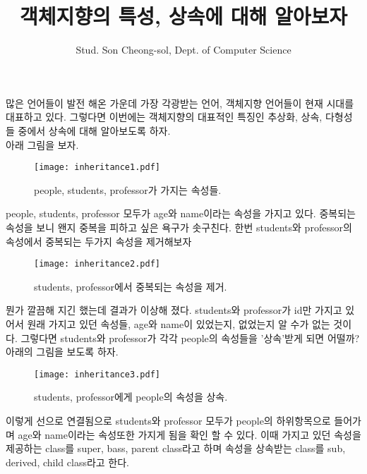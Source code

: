 \documentclass{oblivoir}
\title{객체지향의 특성, 상속에 대해 알아보자 }
\author{Stud. Son Cheong-sol, Dept. of Computer Science}
\begin{document}
\maketitle

많은 언어들이 발전 해온 가운데 가장 각광받는 언어, 객체지향 언어들이 현재 시대를 대표하고 있다. 그렇다면 이번에는 객체지향의 대표적인 특징인 추상화, 상속, 다형성들 중에서 상속에 대해 알아보도록 하자. \\
아래 그림을 보자.

\begin{figure}[h]
  \centering
  \texttt{[image: inheritance1.pdf]}
  \caption{ people, students, professor가 가지는 속성들.}
\end{figure}

people, students, professor 모두가 age와 name이라는 속성을 가지고 있다. 중복되는 속성을 보니 왠지 중복을 피하고 싶은 욕구가 솟구친다. 한번 students와 professor의 속성에서 중복되는 두가지 속성을 제거해보자

\begin{figure}[h]
  \centering
  \texttt{[image: inheritance2.pdf]}
  \caption{ students, professor에서 중복되는 속성을 제거.}
\end{figure}

뭔가 깔끔해 지긴 했는데 결과가 이상해 졌다. students와 professor가 id만 가지고 있어서 원래 가지고 있던 속성들, age와 name이 있었는지, 없었는지 알 수가 없는 것이다. 그렇다면 students와 professor가 각각 people의 속성들을 '상속'받게 되면 어떨까?\\
아래의 그림을 보도록 하자.

\begin{figure}[h]
  \centering
  \texttt{[image: inheritance3.pdf]}
  \caption{ students, professor에게 people의 속성을 상속.}
\end{figure}

이렇게 선으로 연결됨으로 students와 professor 모두가 people의 하위항목으로 들어가며 age와 name이라는 속성또한 가지게 됨을 확인 할 수 있다. 이때 가지고 있던 속성을 제공하는 class를 super, bass, parent class라고 하며 속성을 상속받는 class를 sub, derived, child class라고 한다.
\end{document}
